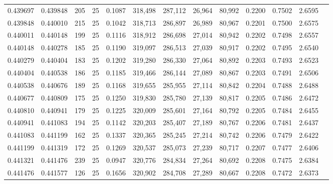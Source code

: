 \begin{tabular}{rrrrrrrrrrrrr}
0.439697 & 0.439848 &   205 &  25 &                                     0.1087 & 318,498 & 287,112 &  26,964 &  80,992 & 0.2200 & 0.7502 & 2.6595 \\
0.439848 & 0.440010 &   215 &  25 &                                     0.1042 & 318,713 & 286,897 &  26,989 &  80,967 & 0.2201 & 0.7500 & 2.6575 \\
0.440011 & 0.440148 &   199 &  25 &                                     0.1116 & 318,912 & 286,698 &  27,014 &  80,942 & 0.2202 & 0.7498 & 2.6557 \\
0.440148 & 0.440278 &   185 &  25 &                                     0.1190 & 319,097 & 286,513 &  27,039 &  80,917 & 0.2202 & 0.7495 & 2.6540 \\
0.440279 & 0.440404 &   183 &  25 &                                     0.1202 & 319,280 & 286,330 &  27,064 &  80,892 & 0.2203 & 0.7493 & 2.6523 \\
0.440404 & 0.440538 &   186 &  25 &                                     0.1185 & 319,466 & 286,144 &  27,089 &  80,867 & 0.2203 & 0.7491 & 2.6506 \\
0.440538 & 0.440676 &   189 &  25 &                                     0.1168 & 319,655 & 285,955 &  27,114 &  80,842 & 0.2204 & 0.7488 & 2.6488 \\
0.440677 & 0.440809 &   175 &  25 &                                     0.1250 & 319,830 & 285,780 &  27,139 &  80,817 & 0.2205 & 0.7486 & 2.6472 \\
0.440810 & 0.440941 &   179 &  25 &                                     0.1225 & 320,009 & 285,601 &  27,164 &  80,792 & 0.2205 & 0.7484 & 2.6455 \\
0.440941 & 0.441083 &   194 &  25 &                                     0.1142 & 320,203 & 285,407 &  27,189 &  80,767 & 0.2206 & 0.7481 & 2.6437 \\
0.441083 & 0.441199 &   162 &  25 &                                     0.1337 & 320,365 & 285,245 &  27,214 &  80,742 & 0.2206 & 0.7479 & 2.6422 \\
0.441199 & 0.441319 &   172 &  25 &                                     0.1269 & 320,537 & 285,073 &  27,239 &  80,717 & 0.2207 & 0.7477 & 2.6406 \\
0.441321 & 0.441476 &   239 &  25 &                                     0.0947 & 320,776 & 284,834 &  27,264 &  80,692 & 0.2208 & 0.7475 & 2.6384 \\
0.441476 & 0.441577 &   126 &  25 &                                     0.1656 & 320,902 & 284,708 &  27,289 &  80,667 & 0.2208 & 0.7472 & 2.6373 \\

\end{tabular}
